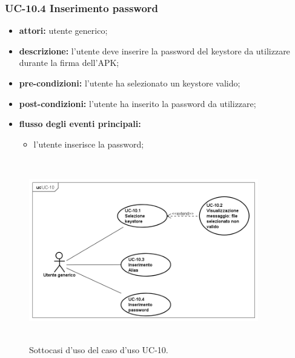 \subsubsection*{UC-10.4 Inserimento password}
\begin{itemize}
    \item \textbf{attori:} utente generico;
    \item \textbf{descrizione:} l'utente deve inserire la password del keystore da utilizzare durante la firma dell'APK;
    \item \textbf{pre-condizioni:} l'utente ha selezionato un keystore valido;
    \item \textbf{post-condizioni:} l'utente ha inserito la password da utilizzare;
    \item \textbf{flusso degli eventi principali:}
    \begin{itemize}
        \item l'utente inserisce la password;
    \end{itemize}
\end{itemize}
\begin{figure}[H]
    \centering
    \includegraphics[width=10cm, height=8cm]{./immagini/usecase/uc_10.png}
    \caption{Sottocasi d'uso del caso d'uso UC-10.}
\end{figure}

